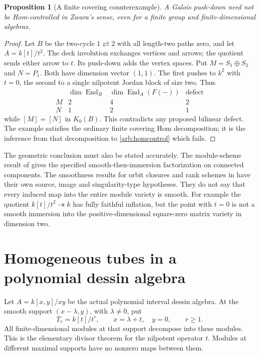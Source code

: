 \documentclass[11pt,oneside,openany]{book}
\newtheorem{proposition}[theorem]{Proposition}
\theoremstyle{definition}\newtheorem{definition}[theorem]{Definition}
\theoremstyle{remark}\newtheorem{remark}[theorem]{Remark}
\begin{document}
\begin{proposition}[A finite covering counterexample]\label{arb:covercounter}
A Galois push-down need not be Hom-controlled in Zwara's sense, even for a
finite group and finite-dimensional algebras.
\end{proposition}
\begin{proof}
Let $B$ be the two-cycle $1\rightleftarrows2$ with all length-two paths zero,
and let $A=k[t]/t^2$. The deck involution exchanges vertices and arrows; the
quotient sends either arrow to $t$. Its push-down adds the vertex spaces.
Put $M=S_1\oplus S_2$ and $N=P_1$. Both have dimension vector $(1,1)$.
The first pushes to $k^2$ with $t=0$, the second to a single nilpotent Jordan
block of size two. Thus
\[
 \begin{array}{c|cc|c}
 &\dim\operatorname{End}_B&\dim\operatorname{End}_A(F(-))&\text{defect}\\\hline
 M&2&4&2\\N&1&2&1
 \end{array}
\]
while $[M]=[N]$ in $K_0(B)$. This contradicts any proposed bilinear defect.
The example satisfies the ordinary finite covering Hom decomposition; it is
the inference from that decomposition to \eqref{arb:homcontrol} which fails.
\end{proof}

The geometric conclusion must also be stated accurately. The module-scheme
result of \cite{ARBZwara} gives the specified smooth-then-immersion
factorization on connected components. The smoothness results for orbit
closures and rank schemes in \cite[Theorems 6.1--6.2]{ARBRiedtmannZwara} have
their own source, image and singularity-type hypotheses. They do not say that
every induced map into the entire module variety is smooth. For example the
quotient $k[t]/t^2\twoheadrightarrow k$ has fully faithful inflation, but the
point with $t=0$ is not a smooth immersion into the positive-dimensional
square-zero matrix variety in dimension two.

\section[Homogeneous tubes]{Homogeneous tubes in a polynomial dessin algebra}
Let $A=k[x,y]/xy$ be the actual polynomial interval dessin algebra. At the
smooth support $(x-\lambda,y)$, with $\lambda\ne0$, put
\[
 T_r=k[t]/t^r,\qquad x=\lambda+t,\quad y=0,\qquad r\ge1.
\]
All finite-dimensional modules at that support decompose into these modules.
This is the elementary divisor theorem for the nilpotent operator $t$.
Modules at different maximal supports have no nonzero maps between them.
\end{document}
